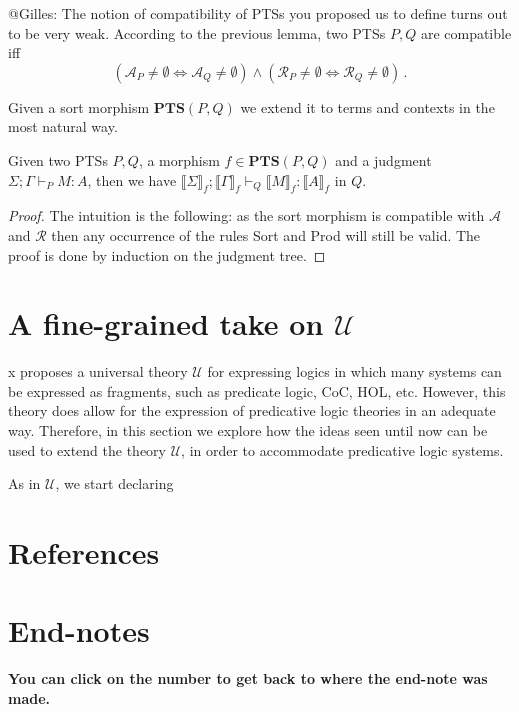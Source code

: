 \documentclass[]{template}
\begin{document}
@Gilles: The notion of compatibility of PTSs you proposed us to define turns out to be very weak. According to the previous lemma, two PTSs $ P, Q $ are compatible iff \[
  (\mathcal{A}_P \neq \emptyset \iff \mathcal{A}_Q \neq \emptyset) \land   (\mathcal{R}_P \neq \emptyset \iff \mathcal{R}_Q \neq \emptyset) 
  \,.\]

Given a sort morphism $ \textbf{PTS}(P, Q) $ we extend it to terms and contexts in the most natural way.

\begin{thm}[]
Given two PTSs $ P, Q $, a morphism $ f \in \textbf{PTS}(P, Q) $ and a judgment $ \Sigma; \Gamma \vdash_P M : A $, then we have $ \llbracket \Sigma \rrbracket_f; \llbracket \Gamma \rrbracket_f \vdash_Q \llbracket M \rrbracket_f : \llbracket A \rrbracket_f $ in $ Q. $
\end{thm}
\begin{proof}
The intuition is the following: as the sort morphism is compatible with $ \mathcal{A} $ and $ \mathcal{R} $ then any occurrence of the rules Sort and Prod will still be valid. The proof is done by induction on the judgment tree.
\end{proof}

\section{A fine-grained take on $ \mathcal{U}$}
\label{sec:fgu}

x proposes a universal theory $ \mathcal{U} $ for expressing logics in which many systems can be expressed as fragments, such as predicate logic, CoC, HOL, etc. However, this theory does allow for the expression of predicative logic theories in an adequate way. Therefore, in this section we explore how the ideas seen until now can be used to extend the theory $ \mathcal{U}$, in order to accommodate predicative logic systems.

As in $ \mathcal{U} $, we start declaring 





\begin{appendices}
  \section{References}
  


\section{End-notes}
\label{sec:foot}
\textbf{You can click on the number to get back to where the end-note was made.}
\printendnotes[custom]

\end{appendices}
\end{document}
